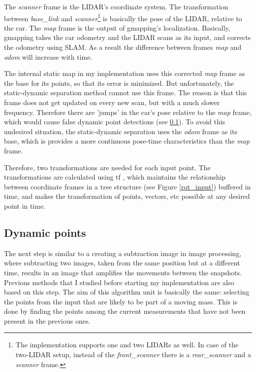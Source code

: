 The \textit{scanner} frame is the LIDAR's coordinate system. The transformation between \textit{base\_link} and \textit{scanner}\footnote{The implementation supports one and two LIDARs as well. In case of the two-LIDAR setup, instead of the \textit{front\_scanner} there is a \textit{rear\_scanner} and a \textit{scanner} frame.} is basically the pose of the LIDAR, relative to the car. The \textit{map} frame is the output of gmapping's localization. Basically, gmapping takes the car odometry and the LIDAR scans as its input, and corrects the odometry using SLAM. As a result the difference between frames \textit{map} and \textit{odom} will increase with time.

The internal static map in my implementation uses this corrected \textit{map} frame as the base for its points, so that its error is minimized. But unfortunately, the static-dynamic separation method cannot use this frame. The reason is that this frame does not get updated on every new scan, but with a much slower frequency. Therefore there are 'jumps' in the car's pose relative to the \textit{map} frame, which would cause false dynamic point detections (see \ref{chap:dynamic_points}). To avoid this undesired situation, the static-dynamic separation uses the \textit{odom} frame as its base, which is provides a more continuous pose-time characteristics than the \textit{map} frame.

Therefore, two transformations are needed for each input point. The transformations are calculated using tf \cite{ros_tf}, which maintains the relationship between coordinate frames in a tree structure (see Figure \ref{rqt_input}) buffered in time, and makes the transformation of points, vectors, etc possible at any desired point in time.

\subsection{Dynamic points}
\label{chap:dynamic_points}
The next step is similar to a creating a subtraction image in image processing, where subtracting two images, taken from the same position but at a different time, results in an image that amplifies the movements between the snapshots. Previous methods\cite{RealTimeDynamicObjectDetection} that I studied before starting my implementation are also based on this step. The aim of this algorithm unit is basically the same: selecting the points from the input that are likely to be part of a moving mass. This is done by finding the points among the current measurements that have not been present in the previous ones.

